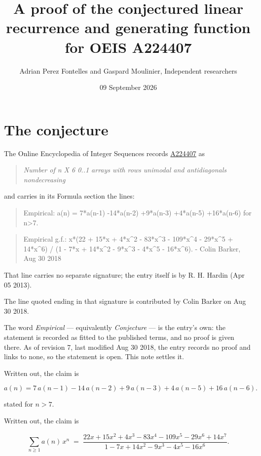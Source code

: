 \documentclass[11pt]{article}
\title{A proof of the conjectured linear recurrence and generating function for OEIS A224407}
\author{Adrian Perez Fontelles and Gaspard Moulinier, Independent researchers}
\date{09 September 2026}
\theoremstyle{definition}
\begin{document}
\maketitle
\section{The conjecture}

The Online Encyclopedia of Integer Sequences records \href{https://oeis.org/A224407}{A224407} as

\begin{quote}\itshape Number of n X 6 0..1 arrays with rows unimodal and antidiagonals nondecreasing\end{quote}

and carries in its Formula section the lines:

\begin{quote}\ttfamily Empirical: a(n) = 7*a(n-1) -14*a(n-2) +9*a(n-3) +4*a(n-5) +16*a(n-6) for n>7.\end{quote}

\begin{quote}\ttfamily Empirical g.f.: x*(22 + 15*x + 4*x\textasciicircum{}2 - 83*x\textasciicircum{}3 - 109*x\textasciicircum{}4 - 29*x\textasciicircum{}5 + 14*x\textasciicircum{}6) / (1 - 7*x + 14*x\textasciicircum{}2 - 9*x\textasciicircum{}3 - 4*x\textasciicircum{}5 - 16*x\textasciicircum{}6). - Colin Barker, Aug 30 2018\end{quote}

That line carries no separate signature; the entry itself is by R. H. Hardin (Apr 05 2013).

The line quoted ending in that signature is contributed by Colin Barker on Aug 30 2018.

The word {\itshape Empirical} --- equivalently {\itshape Conjecture} --- is the entry's own: the statement is recorded as fitted to the published terms, and no proof is given there. As of revision 7, last modified Aug 30 2018, the entry records no proof and links to none, so the statement is open. This note settles it.

Written out, the claim is

\[a(n) = 7\,a(n-1) - 14\,a(n-2) + 9\,a(n-3) + 4\,a(n-5) + 16\,a(n-6).\]

stated for $n > 7$.

Written out, the claim is

\[\sum_{n \ge 1} a(n)\,x^n \;=\; \frac{22x + 15x^{2} + 4x^{3} - 83x^{4} - 109x^{5} - 29x^{6} + 14x^{7}}{1 - 7x + 14x^{2} - 9x^{3} - 4x^{5} - 16x^{6}}.\]
\end{document}
